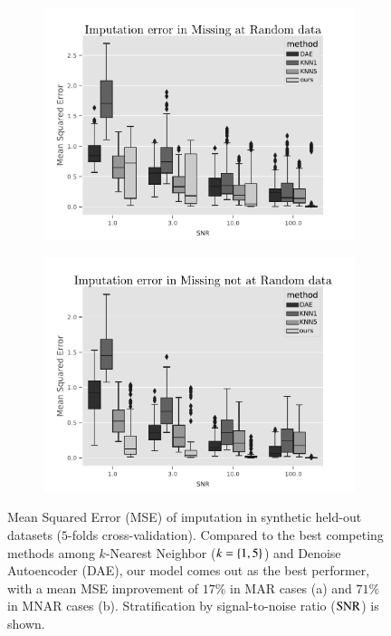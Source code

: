 \begin{figure}[htb]
\centering
\begin{subfigure}{.49\textwidth}
	\centering
        \includegraphics[width=\textwidth]{./tex/fig/mar_imput_err_boxplot.pdf}
        \caption{}
        \label{fig:synthetic_benchmark_mar_box}
\end{subfigure}%
\hfill
\begin{subfigure}{.49\textwidth}
	\centering
        \includegraphics[width=\textwidth]{./tex/fig/mnar_imput_err_boxplot.pdf}
	\caption{}
        \label{fig:synthetic_benchmark_mnar_box}
\end{subfigure}
\caption{
Mean Squared Error (MSE) of imputation in synthetic held-out datasets ($5$-folds cross-validation).
Compared to the best competing methods among $k$-Nearest Neighbor ($k=\left\{1, 5\right\}$) and Denoise Autoencoder (DAE), our model comes out as the best performer, with a mean MSE improvement of $17\%$ in MAR cases (a) and $71\%$ in MNAR cases (b).
Stratification by signal-to-noise ratio ($\operatorname{SNR}$) is shown.
}
\label{fig:synthetic_benchmark_box}
\end{figure}

